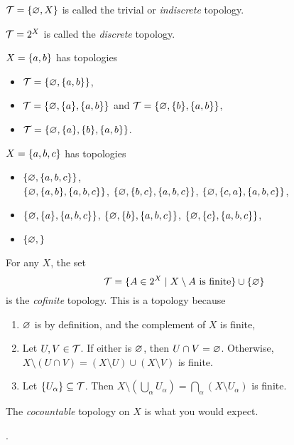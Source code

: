 \begin{examples}
    \item $\mathcal{T} = \{\varnothing, X\}$ is called the trivial or \emph{indiscrete}
        topology.
    \item $\mathcal{T} = 2^X$ is called the \emph{discrete} topology.
    \item $X = \{a, b\}$ has topologies
    \begin{itemize}
        \item $\mathcal{T} = \{\varnothing, \{a, b\}\}$,
        \item $\mathcal{T} = \{\varnothing, \{a\}, \{a, b\}\}$ and
            $\mathcal{T} = \{\varnothing, \{b\}, \{a, b\}\}$,
        \item $\mathcal{T} = \{\varnothing, \{a\}, \{b\}, \{a, b\}\}$.
    \end{itemize}
    \item $X = \{a, b, c\}$ has topologies
    \begin{itemize}
        \item $\{\varnothing, \{a, b, c\}\}$, \\
            $\{\varnothing, \{a, b\}, \{a, b, c\}\}$,
            $\{\varnothing, \{b, c\}, \{a, b, c\}\}$,
            $\{\varnothing, \{c, a\}, \{a, b, c\}\}$,
        \item $\{\varnothing, \{a\}, \{a, b, c\}\}$,
            $\{\varnothing, \{b\}, \{a, b, c\}\}$,
            $\{\varnothing, \{c\}, \{a, b, c\}\}$,
        \item $\{\varnothing, \}$
    \end{itemize}
    \item For any $X$, the set \[
        \mathcal{T} = \{A \in 2^X \mid X \setminus A \text{ is finite}\}
                \cup \{\varnothing\}
    \] is the \emph{cofinite} topology.
    This is a topology because
    \begin{enumerate}[label=\small(T\arabic*)]
        \item $\varnothing$ is by definition, and the complement of $X$ is finite,
        \item Let $U, V \in \mathcal{T}$.
            If either is $\varnothing$, then $U \cap V = \varnothing$.
            Otherwise, $X \setminus (U \cap V) = (X \setminus U) \cup (X \setminus V)$
            is finite.
        \item Let $\{U_\alpha\} \subseteq \mathcal{T}$.
            Then $X \setminus (\bigcup_\alpha U_\alpha)
                = \bigcap_\alpha (X \setminus U_\alpha)$ is finite.
    \end{enumerate}
    \item The \emph{cocountable} topology on $X$ is what you would expect.
    \item {}.
\end{examples}


